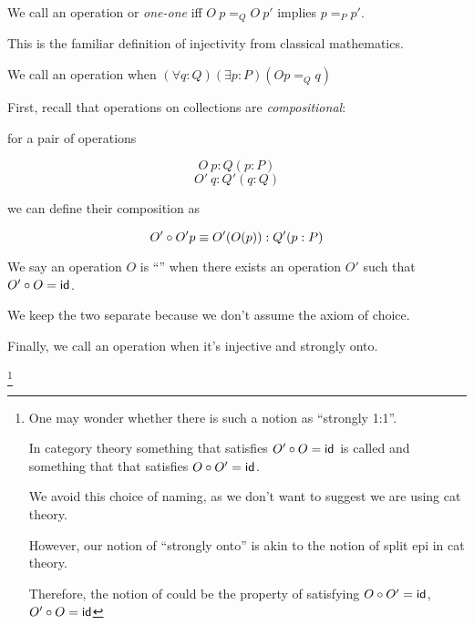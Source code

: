 \begin{definition} We call an operation
   or \emph{one-one} iff \(O\ p =_Q O\ p'\) implies \(p
  =_P p'\).
\end{definition}

This is the familiar definition of injectivity from classical
mathematics.

\begin{definition} We call an operation
   when \((\forall q : Q)(\exists p : P) (Op =_Q
  q)\)
\end{definition}

First, recall that operations on collections are \emph{compositional}:

for a pair of operations

\[ O\ p: Q(p:P) \]
\[ O'\ q: Q'(q:Q) \]

we can define their composition as

\[ \compos{O'}{O' p} \equiv O'(O(p)) : Q'(p : P) \]

We say an operation $O$ is ``'' when there
exists an operation \(O'\) such that \(\compos{O'}{O} = \ident_Q\).

We keep the two separate because we don't assume the axiom of choice.

\begin{definition} Finally, we call an operation
   when it's injective and strongly onto.
\end{definition}


\footnote{ One may wonder whether there is such a notion as ``strongly
  1:1''.

  
  In category theory something that satisfies \(\compos{O'}{O} =
  \ident_P\) is called  and  something that
  that satisfies \(\compos{O}{O'} = \ident_Q\).

  We avoid this choice of naming, as we don't want to suggest we are
  using cat theory.

  However, our notion of ``strongly onto'' is akin to the notion of
  split epi in cat theory.

  Therefore, the notion of  could be the
  property of satisfying \(\compos{O}{O'} = \ident_Q\),
  \(\compos{O'}{O} = \ident_P\) }


